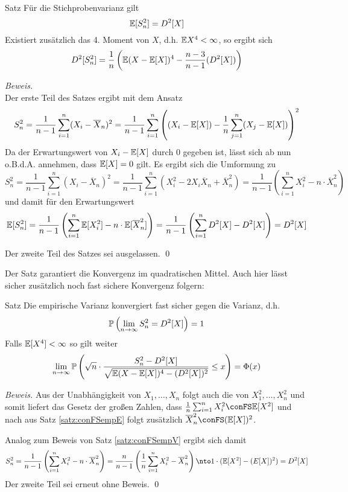 \begin{colbox}{Satz}\label{satz:conFSempV}
    Für die Stichprobenvarianz gilt 
    \[
        \E[S_n^2] = D^2[X]
    \]
    Existiert zusätzlich das 4. Moment von $X$, d.h. $\E X^4<\infty$, so ergibt sich 
    \[
        D^2[S_n^2] = \dfrac{1}{n}\left(\E(X-\E[X])^4-\dfrac{n-3}{n-1}(D^2[X])\right)
    \]
\end{colbox}
\textit{Beweis.} \\
Der erste Teil des Satzes ergibt mit dem Ansatz
\[
    S_n^2 
    = \dfrac{1}{n-1} \sum_{i=1}^{n} (X_i-\overline{X}_n)^2 
    = \dfrac{1}{n-1} \sum_{i=1}^{n} \left((X_i-\E[X]) - \dfrac{1}{n}\sum_{j=1}^{n}(X_j-\E[X])\right)^2
\]
Da der Erwartungswert von $X_i-\E[X]$ durch $0$ gegeben ist, lässt sich ab nun o.B.d.A. annehmen, dass $\E[X]=0$ gilt.
Es ergibt sich die Umformung zu 
\[
    S_n^2 
    = \dfrac{1}{n-1} \sum_{i=1}^{n}(X_i-\overline{X}_n)^2 
    = \dfrac{1}{n-1} \sum_{i=1}^{n}(X_i^2-2X_i\overline{X}_n+\overline{X}_n^2)
    = \dfrac{1}{n-1} \left(\sum_{i=1}^{n} X_i^2 - n\cdot\overline{X}_n^2\right)
\] 
und damit für den Erwartungswert
\[
    \E[S_n^2] 
    = \dfrac{1}{n-1} \left(\sum_{i=1}^{n} \E[X_i^2] - n\cdot\E[\overline{X}_n^2]\right)
    =\dfrac{1}{n-1} \left(\sum_{i=1}^{n} D^2[X] - D^2[X]\right) 
    = D^2[X]
\] 

Der zweite Teil des Satzes sei ausgelassen.
\qed

Der Satz garantiert die Konvergenz im quadratischen Mittel. Auch hier lässt sicher zusätzlich noch fast sichere 
Konvergenz folgern:

\begin{colbox}{Satz}
    Die empirische Varianz konvergiert fast sicher gegen die Varianz, d.h. 
    \[
        \P\left(\lim_{n\to\infty} S_n^2 = D^2[X]\right) = 1
    \]
    Falls $\E[X^4] < \infty$ so gilt weiter 
    \[
        \lim_{n\to\infty} \P\left(\sqrt{n}\cdot\frac{S_n^2 - D^2[X]}{\sqrt{\E(X-\E[X])^4 - (D^2[X])^2}} \leq x\right) 
        = \Phi(x)
    \]
\end{colbox}
\textit{Beweis.} Aus der Unabhängigkeit von $X_1,\dots,X_n$ folgt auch die von $X_1^2,\dots,X_n^2$ und somit liefert
das Gesetz der großen Zahlen, dass $\tfrac{1}{n}\sum_{i=1}^{n} X_i^2 \conFS \E[X^2]$ und nach aus 
Satz \ref{satz:conFSempE} folgt zusätzlich $\overline{X}_n^2 \conFS (\E[X])^2$.

Analog zum Beweis von Satz \ref{satz:conFSempV} ergibt sich damit 
\[
    S_n^2 
    = \dfrac{1}{n-1}\left(\sum_{i=1}^{n}X_i^2 - n\cdot \overline{X}_n^2\right) 
    = \dfrac{n}{n-1}\left(\dfrac{1}{n}\sum_{i=1}^{n}X_i^2 - \overline{X}_n^2\right) 
    \nto 1\cdot(\E[X^2] - (E[X])^2) = D^2[X]
\]
Der zweite Teil sei erneut ohne Beweis.
\qed 

